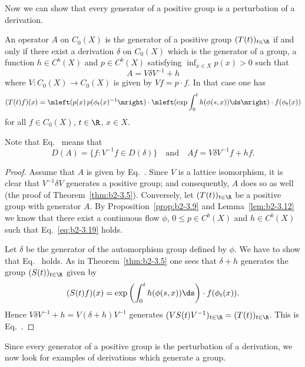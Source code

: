 Now we can show that every generator of a positive group is a perturbation of a derivation.
\begin{theorem}\label{thm:b2-3.14}
An operator $A$ on $C_{0}(X)$ is the generator of a positive group $(T(t))_{t \in \R}$ if and only if there exist a derivation $\delta$ on $C_{0}(X)$ which is the generator of a group, a function $h \in C^{b}(X)$ and $p \in C^{b}(X)$ satisfying $\inf_{x \in X} p(x) > 0$ such that
\begin{equation}\label{eq:b2-3.18}
A = V\delta V^{-1} + h
\end{equation}
where $V \colon C_{0}(X) \to C_{0}(X)$ is given by $Vf = p \cdot f$. In that case one has
\begin{equation}\label{eq:b2-3.19}
(T(t)f)(x) = \mleft( p(x) \, p(\phi_{t}(x)^{-1} \mright) \cdot 
\mleft(\exp \int_{0}^{t} h(\phi(s,x)) \ds \mright) \cdot f(\phi_{t}(x))
\end{equation}
for all $f \in C_{0}(X)$, $t \in \R$, $x \in X$.
\end{theorem}
Note that  Eq.~ means that 
%
\[
	D(A) = \{ f \colon V^{-1}f \in D(\delta) \}
	\quad \text{and} \quad
	Af = V\delta V^{-1}f + hf .
\]
\begin{proof}
Assume that $A$ is given by Eq.~.
Since $V$ is a lattice isomorphism, it is clear that $V^{-1}\delta V$ generates a positive group; and consequently, $A$ does so as well (\cf the proof of Theorem~\ref{thm:b2-3.5}).
Conversely, let $(T(t))_{t \in \R}$ be a positive group with generator $A$.
By Proposition~\ref{prop:b2-3.9} and Lemma~\ref{lem:b2-3.12} we know that there exist a continuous flow $\phi$, $0 \leq  p \in C^{b}(X)$ and $h \in C^{b}(X)$ such that Eq.~\eqref{eq:b2-3.19} holds.

Let $\delta$ be the generator of the automorphism group defined by $\phi$.
We have to show that Eq.~ holds.
As in Theorem~\ref{thm:b2-3.5} one sees that $\delta + h$ generates the group $(S(t))_{t \in \R}$ given by 
\[
(S(t)f)(x) = \exp\left(\int_{0}^{t} h(\phi(s,x)) \ds \right) \cdot f(\phi_{t}(x)).
\]
Hence $V\delta V^{-1} + h = V(\delta + h)V^{-1}$ generates $(VS(t)V^{-1})_{t \in \R} = (T(t))_{t \in \R}$.
This is Eq.~.
\end{proof}
Since every generator of a positive group is the perturbation of a derivation, we now look for examples of derivations which generate a group.
